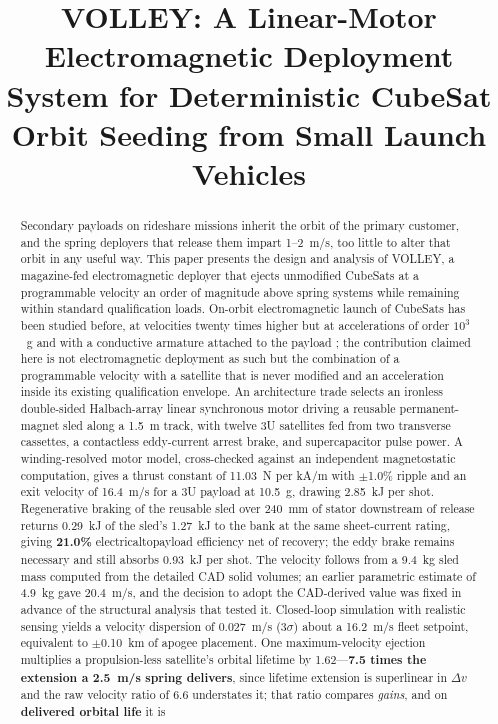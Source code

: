 \documentclass[conference]{IEEEtran}
\begin{document}
\title{VOLLEY: A Linear-Motor Electromagnetic Deployment System for Deterministic CubeSat Orbit Seeding from Small Launch Vehicles}

\author{
}

\maketitle

\begin{abstract}
Secondary payloads on rideshare missions inherit the orbit of the primary customer, and the spring deployers that release them impart 1--2~m/s, too little to alter that orbit in any useful way. This paper presents the design and analysis of VOLLEY, a magazine-fed electromagnetic deployer that ejects unmodified CubeSats at a programmable velocity an order of magnitude above spring systems while remaining within standard qualification loads. On-orbit electromagnetic launch of CubeSats has been studied before, at velocities twenty times higher but at accelerations of order $10^3$~g and with a conductive armature attached to the payload \cite{feng2025}; the contribution claimed here is not electromagnetic deployment as such but the combination of a programmable velocity with a satellite that is never modified and an acceleration inside its existing qualification envelope. An architecture trade selects an ironless double-sided Halbach-array linear synchronous motor driving a reusable permanent-magnet sled along a 1.5~m track, with twelve 3U satellites fed from two transverse cassettes, a contactless eddy-current arrest brake, and supercapacitor pulse power. A winding-resolved motor model, cross-checked against an independent magnetostatic computation, gives a thrust constant of 11.03~N per kA/m with $\pm$1.0\% ripple and an exit velocity of 16.4~m/s for a 3U payload at 10.5~g, drawing 2.85~kJ per shot. Regenerative braking of the reusable sled over 240~mm of stator downstream of release returns 0.29~kJ of the sled's 1.27~kJ to the bank at the same sheet-current rating, giving \textbf{21.0\%} electrical\-to\-payload efficiency net of recovery; the eddy brake remains necessary and still absorbs 0.93~kJ per shot. The velocity follows from a 9.4~kg sled mass computed from the detailed CAD solid volumes; an earlier parametric estimate of 4.9~kg gave 20.4~m/s, and the decision to adopt the CAD-derived value was fixed in advance of the structural analysis that tested it. Closed-loop simulation with realistic sensing yields a velocity dispersion of 0.027~m/s (3$\sigma$) about a 16.2~m/s fleet setpoint, equivalent to $\pm$0.10~km of apogee placement. One maximum-velocity ejection multiplies a propulsion-less satellite's orbital lifetime by 1.62---\textbf{7.5 times the extension a 2.5~m/s spring delivers}, since lifetime extension is superlinear in $\Delta v$ and the raw velocity ratio of 6.6 understates it; that ratio compares \emph{gains}, and on \textbf{delivered orbital life} it is 
\end{abstract}
\end{document}
